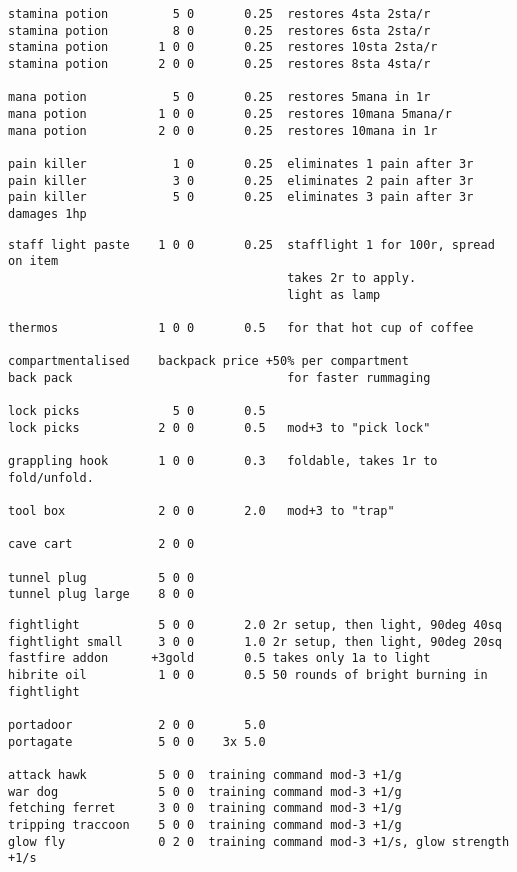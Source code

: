 \begin{verbatim}
stamina potion         5 0       0.25  restores 4sta 2sta/r
stamina potion         8 0       0.25  restores 6sta 2sta/r
stamina potion       1 0 0       0.25  restores 10sta 2sta/r
stamina potion       2 0 0       0.25  restores 8sta 4sta/r

mana potion            5 0       0.25  restores 5mana in 1r
mana potion          1 0 0       0.25  restores 10mana 5mana/r
mana potion          2 0 0       0.25  restores 10mana in 1r

pain killer            1 0       0.25  eliminates 1 pain after 3r
pain killer            3 0       0.25  eliminates 2 pain after 3r
pain killer            5 0       0.25  eliminates 3 pain after 3r damages 1hp

\end{verbatim} \pagebreak[1] \begin{verbatim}
staff light paste    1 0 0       0.25  stafflight 1 for 100r, spread on item
                                       takes 2r to apply.
                                       light as lamp

thermos              1 0 0       0.5   for that hot cup of coffee

compartmentalised    backpack price +50% per compartment
back pack                              for faster rummaging

lock picks             5 0       0.5
lock picks           2 0 0       0.5   mod+3 to "pick lock"

grappling hook       1 0 0       0.3   foldable, takes 1r to fold/unfold.

tool box             2 0 0       2.0   mod+3 to "trap"

cave cart            2 0 0

tunnel plug          5 0 0
tunnel plug large    8 0 0

\end{verbatim} \pagebreak[1] \begin{verbatim}
fightlight           5 0 0       2.0 2r setup, then light, 90deg 40sq
fightlight small     3 0 0       1.0 2r setup, then light, 90deg 20sq
fastfire addon      +3gold       0.5 takes only 1a to light
hibrite oil          1 0 0       0.5 50 rounds of bright burning in fightlight

portadoor            2 0 0       5.0
portagate            5 0 0    3x 5.0

attack hawk          5 0 0  training command mod-3 +1/g
war dog              5 0 0  training command mod-3 +1/g
fetching ferret      3 0 0  training command mod-3 +1/g
tripping traccoon    5 0 0  training command mod-3 +1/g
glow fly             0 2 0  training command mod-3 +1/s, glow strength +1/s


\end{verbatim}
\normalsize


